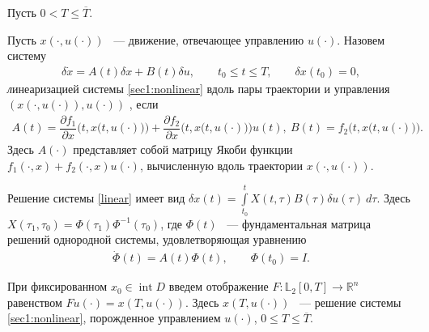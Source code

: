 \documentclass[../main.tex]{subfiles}
\begin{document}
	Пусть $ 0 <  T \leqslant \overline{T} $.
	\begin{definition}\label{def:linearized_system}
		Пусть $ x(\cdot,u(\cdot)) $ ~--- движение, отвечающее управлению $ u(\cdot)$. Назовем систему
		\begin{gather}\label{linear}
			\delta \dot{x} =  A(t) \delta x + B(t) \delta u, \qquad t_0 \leqslant t \leqslant T, \qquad \delta x(t_0) = 0,
		\end{gather}
		{\textit линеаризацией} системы \eqref{sec1:nonlinear} вдоль пары траектории и управления $\left( x(\cdot,u(\cdot)),u(\cdot)\right)   $ , если 
		\begin{gather*}
		    A(t) = \dfrac{\partial f_1}{\partial x} \Big(t,x\big(t,u(\cdot)\big)\Big) + \dfrac{\partial f_2}{\partial x}\Big(t,x\big(t,u(\cdot)\big)\Big) u(t), \  
		    B(t) = f_2 \Big(t,x\big(t,u(\cdot)\big)\Big).
		\end{gather*} Здесь $ A(\cdot) $ представляет собой матрицу Якоби функции $ f_1(\cdot, x) + f_2(\cdot, x) u(\cdot) $, вычисленную вдоль траектории $ x(\cdot,u(\cdot)) $.
	\end{definition}
	Решение системы \eqref{linear} имеет вид $\delta x(t) =  \int\limits_{t_0}^{t} X(t, \tau) B(\tau) \delta u(\tau) \ d\tau $. Здесь $ X(\tau_1,\tau_0)= \Phi(\tau_1) \Phi^{-1}(\tau_0) $, где $\Phi(t) $ ~--- фундаментальная матрица решений однородной системы, удовлетворяющая уравнению 
	\begin{gather*}
		\dot{\Phi}(t) = A(t) \Phi(t), \qquad \Phi(t_0) = I.
	\end{gather*}
	
	При фиксированном $x_0 \in \operatorname{int} D $ введем отображение $F: \mathbb{L}_2[0,T] \rightarrow \mathbb{R}^n $ равенством $Fu(\cdot) = x(T,u(\cdot))$. Здесь $ x(T,u(\cdot))$ ~--- решение системы \eqref{sec1:nonlinear}, порожденное управлением $u(\cdot)$, $0 \leqslant T \leqslant \overline{T}$. 
	
\end{document}
